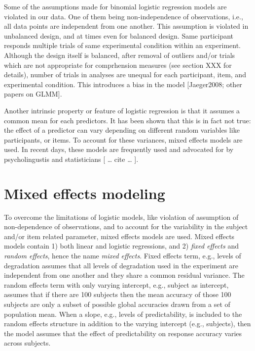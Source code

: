\documentclass[a4paper, nobind]{templates/ociamthesis}
\begin{document}
Some of the assumptions made for binomial logistic regression models are violated in our data.
One of them being non-independence of observations, i.e., all data points are independent from one another.
This assumption is violated in unbalanced design, and at times even for balanced design.
Same participant responds multiple trials of same experimental condition within an experiment.
Although the design itself is balanced, after removal of outliers and/or trials which are not appropriate for comprhension measures (see section XXX for details), number of trials in analyses are unequal for each participant, item, and experimental condition.
This introduces a bias in the model {[}Jaeger2008; other papers on GLMM{]}.

Another intrinsic property or feature of logistic regression is that it assumes a common mean for each predictors.
It has been shown that this is in fact not true: the effect of a predictor can vary depending on different random variables like participants, or items.
To account for these variances, mixed effects models are used.
In recent days, these models are frequently used and advocated for by psycholingustis and statisticians {[} \ldots{} cite \ldots{} {]}.

\hypertarget{mixed-effects-modeling}{%
\section{Mixed effects modeling}\label{mixed-effects-modeling}}

To overcome the limitations of logistic models, like violation of assumption of non-dependence of observations, and to account for the variability in the subject and/or item related parameter, mixed effects models are used.
Mixed effects models contain 1) both linear and logistic regressions, and 2) \emph{fixed effects} and \emph{random effects}, hence the name \emph{mixed effects}.
Fixed effects term, e.g., levels of degradation assumes that all levels of degradation used in the experiment are independent from one another and they share a common residual variance.
The random effects term with only varying intercept, e.g., subject as intercept, assumes that if there are 100 subjects then the mean accuracy of those 100 subjects are only a subset of possible global accuracies drawn from a set of population mean.
When a slope, e.g., levels of predictability, is included to the random effects structure in addition to the varying intercept (e.g., subjects), then the model assumes that the effect of predictability on response accuracy varies across subjects.
\end{document}
